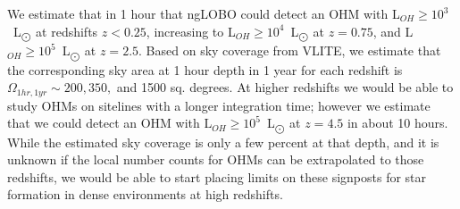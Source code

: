 \documentclass[11pt]{article}
\newcommand{\todocitation}{\todo[inline,color=teal]}
\begin{document}
We estimate that in 1 hour that ngLOBO could detect an OHM with L$_{OH} \geq 10^{3}$~L$_{\bigodot}$ at redshifts $z < 0.25$, increasing to L$_{OH} \geq 10^{4}$~L$_{\bigodot}$ at $z = 0.75$, and L$_{OH} \geq 10^{5}$~L$_{\bigodot}$ at $z = 2.5$.   Based on sky coverage from VLITE, we estimate that the corresponding sky area at 1 hour depth in 1 year for each redshift is $\Omega_{1hr, 1yr} \sim 200, 350,$ and 1500 sq. degrees.  At higher redshifts we would be able to study OHMs on sitelines with a longer integration time; however we estimate that we could detect an OHM with L$_{OH} \geq 10^{5}$~L$_{\bigodot}$ at $z = 4.5$ in about 10 hours.  While the estimated sky coverage is only a few percent at that depth, and it is unknown if the local number counts for OHMs can be extrapolated to those redshifts, we would be able to start placing limits on these signposts for star formation in dense environments at high redshifts.
















\end{document}
